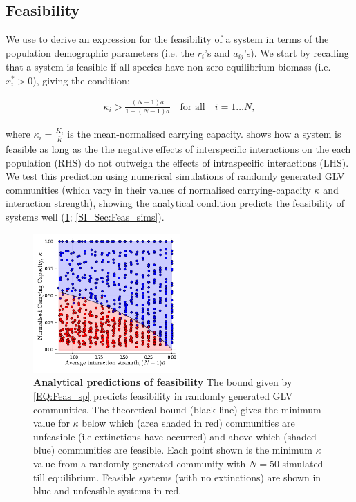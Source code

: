 \documentclass{article}
\begin{document}
\subsection{Feasibility} \label{Sec:Feasibility}
We use  to derive an expression for the feasibility of a system in terms of the population demographic parameters (i.e. the $r_i$'s and $a_{ij}$'s). We start by recalling that a system is feasible if all species have non-zero equilibrium biomass (i.e. $x_i^* > 0 $), giving the condition:

\begin{align} \label{EQ:Feas_sp}
  \kappa_i > \frac{(N-1)\bar{a}}{1 + (N-1)\bar{a}} \quad \text{for all} \quad i = 1 \ldots N,
\end{align}

where $\kappa_i = \frac{K_i}{\bar{K}}$ is the mean-normalised carrying capacity.  shows how a system is feasible as long as the the negative effects of interspecific interactions on the each population (RHS) do not outweigh the effects of intraspecific interactions (LHS). We test this prediction using numerical simulations of randomly generated GLV communities (which vary in their values of normalised carrying-capacity $\kappa$ and interaction strength), showing the analytical condition predicts the feasibility of systems well (\cref{Fig:Feasability_Bound}; \cref{SI_Sec:Feas_sims}). 

\begin{figure}[h] 
    \centering
    \includegraphics[width = 0.5\textwidth]{docs/Figures/Fig_1.pdf}
    \caption[width = \textwidth]{\textbf{Analytical predictions of feasibility} The bound given by \cref{EQ:Feas_sp} predicts feasibility in randomly generated GLV communities. The theoretical bound (black line) gives the minimum value for $\kappa$ below which (area shaded in red) communities are unfeasible (i.e extinctions have occurred) and above which (shaded blue) communities are feasible. Each point shown is the minimum $\kappa$ value from a randomly generated community with $N=50$ simulated till equilibrium. Feasible systems (with no extinctions) are shown in blue and unfeasible systems in red.}
    \label{Fig:Feasability_Bound}
\end{figure}
\end{document}
